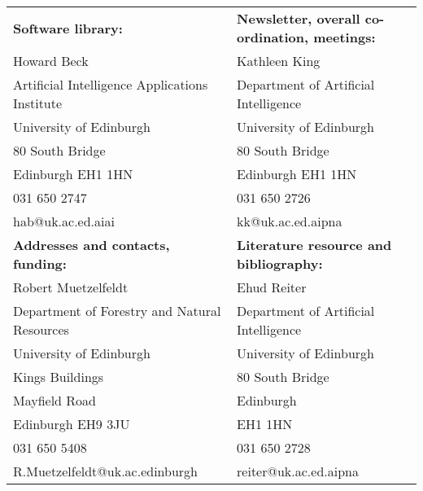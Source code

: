 \begin{tabular}{l|l}
{\bf Software library:} & {\bf Newsletter, overall co-ordination,
meetings:}\\ 
Howard Beck &  Kathleen King\\
Artificial Intelligence Applications Institute &  Department of
Artificial Intelligence \\
University of Edinburgh & University of Edinburgh\\
80 South Bridge & 80 South Bridge\\
Edinburgh EH1 1HN & Edinburgh EH1 1HN\\
031 650 2747 & 031 650 2726\\
hab@uk.ac.ed.aiai & kk@uk.ac.ed.aipna\\
\hline
{\bf Addresses and contacts, funding:} & {\bf Literature resource and bibliography:} \\ 
Robert Muetzelfeldt & Ehud Reiter\\
Department of Forestry and Natural Resources &   Department of Artificial Intelligence\\
University of Edinburgh & University of Edinburgh\\
Kings Buildings & 80 South Bridge\\
 Mayfield Road &  Edinburgh\\
Edinburgh   EH9 3JU & EH1 1HN\\
 031 650 5408 & 031 650 2728\\
 R.Muetzelfeldt@uk.ac.edinburgh & reiter@uk.ac.ed.aipna\\
\hline

\end{tabular}


